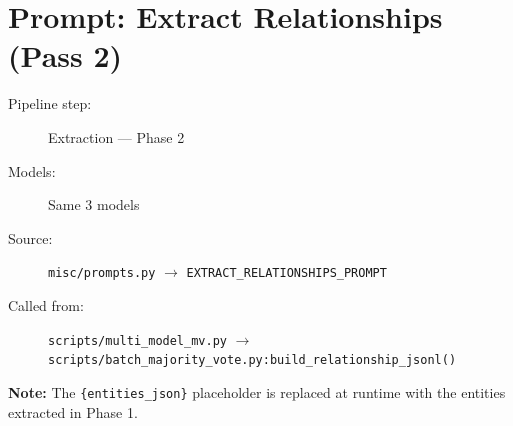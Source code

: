 \section*{Prompt: Extract Relationships (Pass 2)}
\begin{description}
\item[Pipeline step:] Extraction --- Phase 2
\item[Models:] Same 3 models
\item[Source:] \texttt{misc/prompts.py} $\rightarrow$ \texttt{EXTRACT\_RELATIONSHIPS\_PROMPT}
\item[Called from:] \texttt{scripts/multi\_model\_mv.py} $\rightarrow$ \texttt{scripts/batch\_majority\_vote.py:build\_relationship\_jsonl()}
\end{description}
\begin{tcolorbox}[colback=yellow!8,colframe=yellow!50!black,left=4pt,right=4pt,top=4pt,bottom=4pt,arc=2pt]
\textbf{Note:} The \texttt{\{entities\_json\}} placeholder is replaced at runtime with the entities extracted in Phase 1.
\end{tcolorbox}

